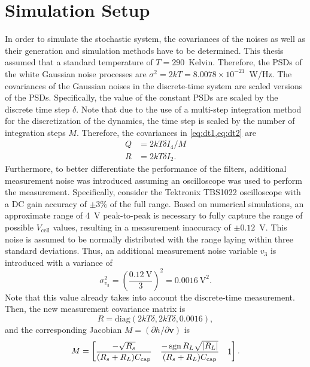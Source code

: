 \documentclass[../zhang_thesis.tex]{subfiles}
\begin{document}
\section{Simulation Setup}

In order to simulate the stochastic system, the covariances of the noises as well as their generation and simulation methods have to be determined. This thesis assumed that a standard temperature of $T=290$~Kelvin. Therefore, the PSDs of the white Gaussian noise processes are $\sigma^2=2kT=8.0078\times 10^{-21}$~W/Hz. The covariances of the Gaussian noises in the discrete-time system are scaled versions of the PSDs. Specifically, the value of the constant PSDs are scaled by the
discrete time step $\delta$. Note that due to the use of a multi-step integration method for the discretization of the dynamics, the time step is scaled by the number of integration steps $M$. Therefore, the covariances in \cref{eq:dt1,eq:dt2} are
\begin{align}
    Q &= 2kT\delta I_4 / M \\
    R &= 2kT\delta I_2.
\end{align}
Furthermore, to better differentiate the performance of the filters, additional measurement noise was introduced assuming an oscilloscope was used to perform the measurement.
Specifically, consider the Tektronix TBS1022 oscilloscope with a DC gain accuracy of $\pm 3\%$ of the full range. Based on numerical simulations, an approximate range of 4~V peak-to-peak is necessary to fully capture the range of possible $V_\text{cell}$ values, resulting in a measurement inaccuracy of $\pm 0.12$~V. This noise is assumed to be normally distributed with the range laying within three standard deviations. Thus, an additional measurement noise variable $v_3$ is introduced with
a variance of
\begin{equation}
    \sigma_{v_3}^2 = \left( \frac{0.12~\text{V}}{3} \right)^2 = 0.0016~\text{V}^2.
\end{equation}
Note that this value already takes into account the discrete-time measurement. Then, the new measurement covariance matrix is
\begin{equation}
    R = \mathrm{diag}(2kT\delta,2kT\delta,0.0016),
\end{equation}
and the corresponding Jacobian $M=(\partial h/\partial\mathbf{v})$ is
\begin{equation}
    M = \begin{bmatrix}
         \dfrac{-\sqrt{R_s}}{(R_s+R_L)C_\text{cap}} & \dfrac{-\operatorname{sgn}{R_L}\sqrt{|R_L|}}{(R_s+R_L)C_\text{cap}} & 1
        \end{bmatrix} .
\end{equation}
\end{document}
